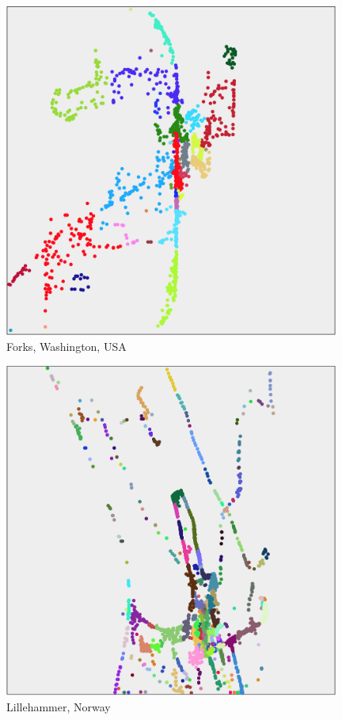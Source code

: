 \begin{appendices}
	\begin{figure}[H]
		\centering
		\includegraphics[width=11cm]{Images/computations/MINCUT_FORKS.png}
		\caption{Forks, Washington, USA}
	\end{figure}

	\begin{figure}
		\centering
		\includegraphics[width=11cm]{Images/computations/MINCUT_LILLEHAMMER.png}
		\caption{Lillehammer, Norway}
	\end{figure}


\end{appendices}
